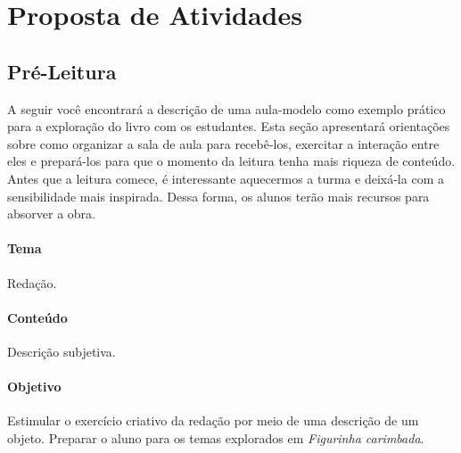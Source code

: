 \documentclass[11pt]{extarticle}
\begin{document}
\section{Proposta de Atividades}
\subsection{Pré-Leitura}

A seguir você encontrará a descrição de uma aula-modelo como exemplo prático para a exploração do livro com os estudantes. Esta seção apresentará orientações sobre como organizar a sala de aula para recebê-los, exercitar a interação entre eles e prepará-los para que o momento da leitura tenha mais riqueza de conteúdo. Antes que a leitura comece, é interessante aquecermos a turma e deixá-la com a sensibilidade mais inspirada. Dessa forma, os alunos terão mais recursos para absorver a obra.


\paragraph{Tema} Redação. 

\paragraph{Conteúdo} Descrição subjetiva. 

\paragraph{Objetivo} Estimular o exercício criativo da redação por meio de uma descrição de um objeto. Preparar o aluno para os temas explorados em \textit{Figurinha carimbada}. 
\end{document}
